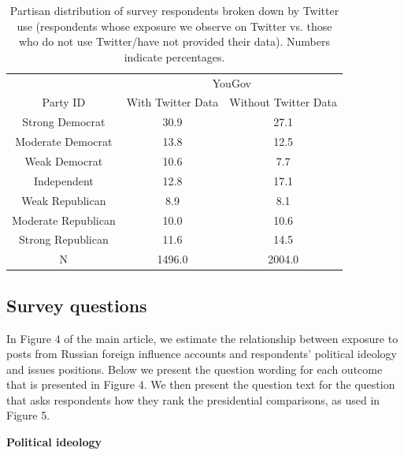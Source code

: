 \documentclass[
  12pt,
]{article}
\begin{document}
\begin{table}[!h]

\caption{\label{tab:unnamed-chunk-5}\label{tab:tab30}Partisan distribution of survey respondents broken down by Twitter use (respondents whose exposure we observe on Twitter vs. those who do not use Twitter/have not provided their data). Numbers indicate percentages.}
\centering
\fontsize{10}{12}\selectfont
\begin{tabular}[t]{c|c|c}
\hline
\multicolumn{1}{c|}{ } & \multicolumn{2}{c}{YouGov} \\
\cline{2-3}
Party ID & With Twitter Data & Without Twitter Data\\
\hline
Strong Democrat & 30.9 & 27.1\\
\hline
Moderate Democrat & 13.8 & 12.5\\
\hline
Weak Democrat & 10.6 & 7.7\\
\hline
Independent & 12.8 & 17.1\\
\hline
Weak Republican & 8.9 & 8.1\\
\hline
Moderate Republican & 10.0 & 10.6\\
\hline
Strong Republican & 11.6 & 14.5\\
\hline
\hline
N & 1496.0 & 2004.0\\
\hline
\end{tabular}
\end{table}

\clearpage

\hypertarget{survey-questions}{%
\subsection{Survey questions}\label{survey-questions}}

In Figure 4 of the main article, we estimate the relationship between exposure to posts from Russian foreign influence accounts and respondents' political ideology and issues positions. Below we present the question wording for each outcome that is presented in Figure 4. We then present the question text for the question that asks respondents how they rank the presidential comparisons, as used in Figure 5.\vspace{6mm}

\textbf{Political ideology}

\newline
\end{document}
